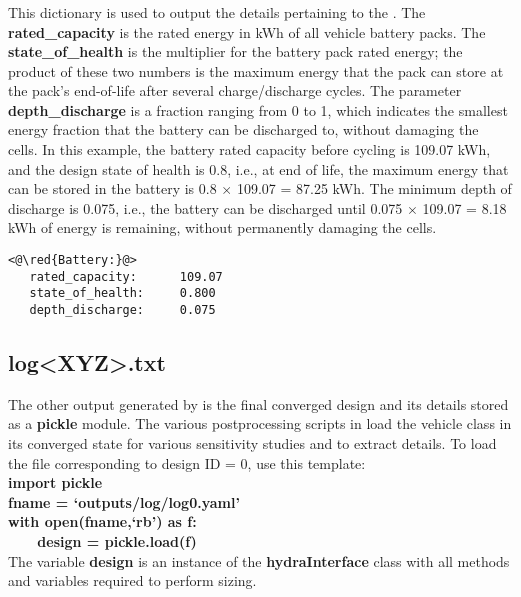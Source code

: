 \subsubsection{}
This dictionary is used to output the details pertaining to the . The \textbf{rated\_capacity} is the rated energy in kWh of all vehicle battery packs. The \textbf{state\_of\_health} is the multiplier for the battery pack rated energy; the product of these two numbers is the maximum energy that the pack can store at the pack's end-of-life after several charge/discharge cycles. The parameter \textbf{depth\_discharge} is a fraction ranging from 0 to 1, which indicates the smallest energy fraction that the battery can be discharged to, without damaging the cells. In this example, the battery rated capacity before cycling is 109.07 kWh, and the design state of health is 0.8, i.e., at end of life, the maximum energy that can be stored in the battery is 0.8 $\times$ 109.07 = 87.25 kWh. The minimum depth of discharge is 0.075, i.e., the battery can be discharged until 0.075 $\times$ 109.07 = 8.18 kWh of energy is remaining, without permanently damaging the cells. 
\begin{lstlisting}
<@\red{Battery:}@>
   rated_capacity:      109.07 
   state_of_health:     0.800 
   depth_discharge:     0.075 
\end{lstlisting}
\subsection{\textbf{log<XYZ>.txt}}
The other output generated by \hydra \spc is the final converged design and its details stored as a \textbf{pickle} module. The various postprocessing scripts in \hydra \spc load the vehicle class in its converged state for various sensitivity studies and to extract details. To load the file corresponding to design ID = 0, use this template:\\
\textbf{import pickle} \\
\textbf{fname     = `outputs/log/log0.yaml'} \\
\textbf{with open(fname,`rb') as f:} \\
\textbf{$\textrm{          }$ $\textrm{    }$ design    = pickle.load(f)} \\
The variable \textbf{design} is an instance of the \textbf{hydraInterface} class with all methods and variables required to perform sizing.

